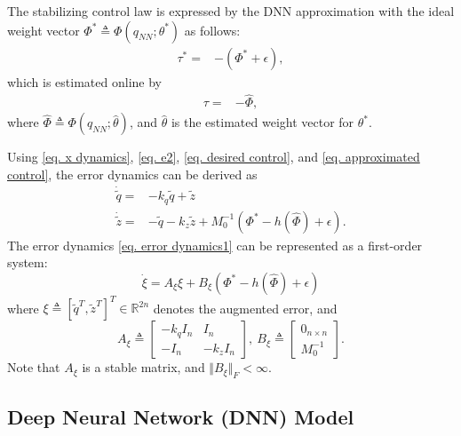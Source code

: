 \documentclass[lettersize,journal]{IEEEtran}
\begin{document}
The stabilizing control law is expressed by the DNN approximation with the ideal weight vector $\Phi^*\triangleq\Phi(q_{NN};\theta^*)$ as follows:
\begin{align}
    \tau^*=& -(\Phi^*+\epsilon),
\end{align}
which is estimated online by
\begin{align}
    \tau =& -\hat\Phi,
    \label{eq. approximated control}
\end{align}
where $\hat\Phi\triangleq\Phi(q_{NN};\hat\theta)$, and  $\hat\theta$ is the estimated weight vector for $\theta^*$.

Using \eqref{eq. x dynamics}, \eqref{eq. e2}, \eqref{eq. desired control}, and \eqref{eq. approximated control}, the error dynamics can be derived as
\begin{equation}
    \begin{aligned}
        \dot {\tilde q} = & -{k_q} {\tilde q} + {\tilde z} \\
        \dot {\tilde z} = & -{\tilde q} -{k_z} {\tilde z} + M_0^{-1} (\Phi^*-h(\hat\Phi)+\epsilon).
    \end{aligned}
    \label{eq. error dynamics1}
\end{equation}
The error dynamics \eqref{eq. error dynamics1} can be represented as a first-order system: 
\begin{equation}
    \dot\xi = A_\xi \xi + B_\xi (\Phi^*-h(\hat\Phi)+\epsilon)
    \label{eq. xi dynamics}
\end{equation}
where 
$\xi\triangleq[{\tilde q}^T  , {\tilde z}^T  ]^T  \in\mathbb{R}^{2n}$ denotes the augmented error,
and
\begin{equation}
    A_\xi \triangleq 
    \begin{bmatrix}
        -{k_q} I_n &I_n\\-I_n& -{k_z} I_n
    \end{bmatrix}
    ,\ 
    B_\xi \triangleq 
    \begin{bmatrix}
        0_{n\times n}\\M_0^{-1}
    \end{bmatrix}.
\end{equation}
Note that $A_\xi$ is a stable matrix, and $\Vert B_\xi\Vert_F<\infty$.

\subsection{Deep Neural Network (DNN) Model}\label{NN definition}
\end{document}
